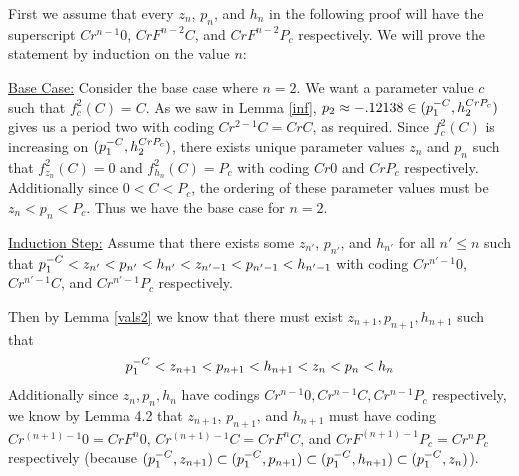 		\begin{myproof}
			First we assume that every $z_n$, $p_n$, and $h_n$ in the following proof will have the superscript $Cr^{n-1}0$, $CrF^{n-2}C$, and $CrF^{n-2}P_c$ respectively. We will prove the statement by induction on the value $n$:

			\underline{Base Case:} Consider the base case where $n = 2$. We want a parameter value $c$ such that $f^2_c (C) = C$. As we saw in Lemma \ref{inf}, $p_2 \approx -.12138 \in (p^{-C}_1, h^{CrP_c}_2)$ gives us a period two with coding $Cr^{2-1}C = CrC$, as required. Since $f^2_c(C)$ is increasing on $(p^{-C}_1, h^{CrP_c}_2)$, there exists unique parameter values $z_n$ and $p_n$ such that $f^2_{z_n}(C) = 0$ and $f^2_{h_n}(C) = P_c$ with coding $Cr0$ and $CrP_c$ respectively. Additionally since $0 < C < P_c$, the ordering of these parameter values must be $z_n < p_n < P_c$. Thus we have the base case for $n = 2$.


			\underline{Induction Step:} Assume that there exists some $z_{n'}$, $p_{n'}$, and $h_{n'}$ for all $n' \leq n$ such that $ p^{-C}_1 < z_{n'} < p_{n'} < h_{n'}< z_{n'-1} < p_{n'-1} < h_{n'-1}$ with coding $Cr^{n'-1}0$, $Cr^{n'-1}C$, and $Cr^{n'-1}P_c$ respectively. 

			Then by Lemma \ref{vals2} we know that there must exist $z_{n+1},p_{n+1},h_{n+1}$ such that
			\[p^{-C}_1 < z_{n+1} < p_{n+1} < h_{n+1} < z_n < p_n < h_n\]
			Additionally since $z_n, p_n, h_n$ have codings $Cr^{n-1}0,Cr^{n-1}C,Cr^{n-1}P_c$ respectively, we know by Lemma 4.2 that $z_{n+1}$, $p_{n+1}$, and $h_{n+1}$ must have coding $Cr^{ (n+1)-1}0 = CrF^{n}0$, $Cr^{ (n+1)-1}C = CrF^{n}C$, and $CrF^{ (n+1)-1}P_c = Cr^{n}P_c$ respectively (because $ (p^{-C}_1, z_{n+1}) \subset (p^{-C}_1, p_{n+1}) \subset (p^{-C}_1, h_{n+1}) \subset (p^{-C}_1, z_n)$).


\end{myproof}
